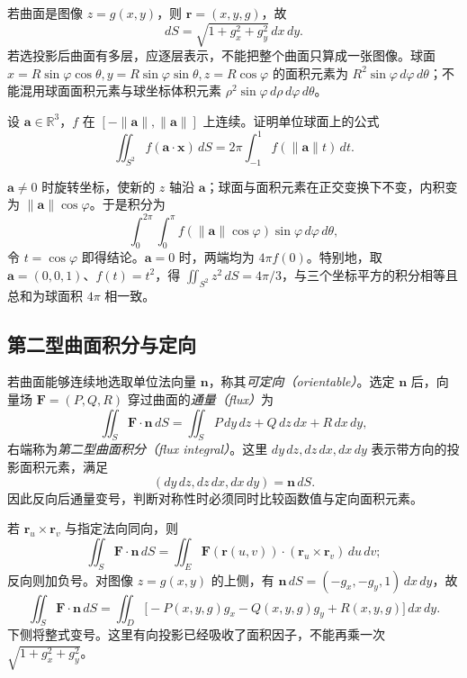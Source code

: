 若曲面是图像 $z=g(x,y)$，则 $\boldsymbol r=(x,y,g)$，故
\begin{equation}
\label{eq:pei-graph-area}
dS=\sqrt{1+g_x^2+g_y^2}\,dx\,dy.
\end{equation}
若选投影后曲面有多层，应逐层表示，不能把整个曲面只算成一张图像。球面 $x=R\sin\varphi\cos\theta,y=R\sin\varphi\sin\theta,z=R\cos\varphi$ 的面积元素为 $R^2\sin\varphi\,d\varphi\,d\theta$；不能混用球面面积元素与球坐标体积元素 $\rho^2\sin\varphi\,d\rho\,d\varphi\,d\theta$。

\begin{example}
\label{ex:pei-spherical-average}
设 $\boldsymbol a\in\mathbb R^3$，$f$ 在 $[-\|\boldsymbol a\|,\|\boldsymbol a\|]$ 上连续。证明单位球面上的公式
\begin{equation}
\label{eq:pei-spherical-average}
\iint_{S^2}f(\boldsymbol a\cdot\boldsymbol x)\,dS
=2\pi\int_{-1}^1f(\|\boldsymbol a\|t)\,dt.
\end{equation}
\end{example}
\begin{solve}
$\boldsymbol a\ne0$ 时旋转坐标，使新的 $z$ 轴沿 $\boldsymbol a$；球面与面积元素在正交变换下不变，内积变为 $\|\boldsymbol a\|\cos\varphi$。于是积分为
\[
\int_0^{2\pi}\!\int_0^\pi f(\|\boldsymbol a\|\cos\varphi)\sin\varphi\,d\varphi\,d\theta,
\]
令 $t=\cos\varphi$ 即得结论。$\boldsymbol a=0$ 时，两端均为 $4\pi f(0)$。特别地，取 $\boldsymbol a=(0,0,1)$、$f(t)=t^2$，得 $\iint_{S^2}z^2\,dS=4\pi/3$，与三个坐标平方的积分相等且总和为球面积 $4\pi$ 相一致。
\end{solve}

\subsection{第二型曲面积分与定向}

若曲面能够连续地选取单位法向量 $\boldsymbol n$，称其\emph{可定向（orientable）}。选定 $\boldsymbol n$ 后，向量场 $\boldsymbol F=(P,Q,R)$ 穿过曲面的\emph{通量（flux）}为
\begin{equation}
\label{eq:pei-flux-definition}
\iint_S\boldsymbol F\cdot\boldsymbol n\,dS
=\iint_SP\,dy\,dz+Q\,dz\,dx+R\,dx\,dy,
\end{equation}
右端称为\emph{第二型曲面积分（flux integral）}。这里 $dy\,dz,dz\,dx,dx\,dy$ 表示带方向的投影面积元素，满足
\[
(dy\,dz,dz\,dx,dx\,dy)=\boldsymbol n\,dS.
\]
因此反向后通量变号，判断对称性时必须同时比较函数值与定向面积元素。

若 $\boldsymbol r_u\times\boldsymbol r_v$ 与指定法向同向，则
\begin{equation}
\label{eq:pei-parametric-flux}
\iint_S\boldsymbol F\cdot\boldsymbol n\,dS
=\iint_E\boldsymbol F(\boldsymbol r(u,v))\cdot
(\boldsymbol r_u\times\boldsymbol r_v)\,du\,dv;
\end{equation}
反向则加负号。对图像 $z=g(x,y)$ 的上侧，有 $\boldsymbol n\,dS=(-g_x,-g_y,1)\,dx\,dy$，故
\begin{equation}
\label{eq:pei-graph-flux}
\iint_S\boldsymbol F\cdot\boldsymbol n\,dS
=\iint_D\bigl[-P(x,y,g)g_x-Q(x,y,g)g_y+R(x,y,g)\bigr]\,dx\,dy.
\end{equation}
下侧将整式变号。这里有向投影已经吸收了面积因子，不能再乘一次 $\sqrt{1+g_x^2+g_y^2}$。

